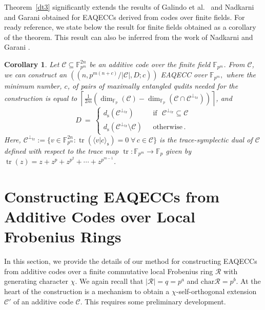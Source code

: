 \documentclass{article}
\DeclareMathOperator{\tr}{tr}
\def\F{\mathbb{F}}
\newtheorem{cor}{Corollary}[section]
\theoremstyle{remark}
\theoremstyle{definition}
\numberwithin{equation}{section}
\begin{document}
Theorem~\ref{dt3} significantly extends the results of Galindo et al.\ \cite{galindo} and Nadkarni and Garani \cite{nadkarni} obtained for EAQECCs derived from codes over finite fields. For ready reference, we state below the result for finite fields obtained as a corollary of the theorem. This result can also be inferred from the work of Nadkarni and Garani \cite{nadkarni}.

\begin{cor}
\label{cor:Fpm}
 Let $\mathcal{C} \subseteq \mathbb{F}_{p^m}^{2n}$ be an additive code over the finite field $\F_{p^m}$. From $\mathcal{C}$, we can construct an  $((n,p^{m(n+c)}/{|\mathcal{C}|} ,D;c))$ EAQECC over $\mathbb{F}_{p^m},$ where the minimum number, $c$, of pairs of maximally entangled qudits needed for the construction is equal to  
$ \left\lceil  \frac{1}{2m} (\dim_{\F_p}(\mathcal{C}) - \dim_{\F_p}(\mathcal{C} \cap \mathcal{C}^{\perp_{\tr}})) \right\rceil$, and
\begin{equation*}
D~=~\left\{\begin{array}{ll}
d_{\mathrm{s}}(\mathcal{C}^{\perp_{\tr}}) & \text{~~if~~}  \mathcal{C}^{\perp_{\tr}} \subseteq \mathcal{C}\\ 
d_{\mathrm{s}}(\mathcal{C}^{\perp_{\tr}}\setminus \mathcal{C} )  & \text{~~otherwise}\,.
\end{array}\right. 
\end{equation*}
Here, $\mathcal{C}^{\perp_{\tr}} := \{v \in \mathbb{F}_{p^m} ^{2n} : \tr( \langle v | c\rangle_{\mathrm{s}}) = 0 \; \forall \, c \in \mathcal{C}\}$ is the trace-symplectic dual of $\mathcal{C}$ defined with respect to the trace map $\tr: \F_{p^m} \to \F_p$ given by $\tr(z) = z+z^p+z^{p^2}+\cdots+z^{p^{m-1}}$.
\end{cor}

  \section{Constructing EAQECCs from  Additive Codes over Local Frobenius Rings}\label{sec3}
  
In this section, we provide the details of our method for constructing EAQECCs from additive codes over a finite commutative local Frobenius ring $\mathcal{R}$ with generating character $\chi$. We again recall that $|\mathcal{R}| = q = p^a$ and $\text{char}\mathcal{R} = p^b$. At the heart of the construction is a mechanism to obtain a $\chi$-self-orthogonal extension $\mathcal{C}'$ of an additive code $\mathcal{C}$. This requires some preliminary development.
\end{document}
